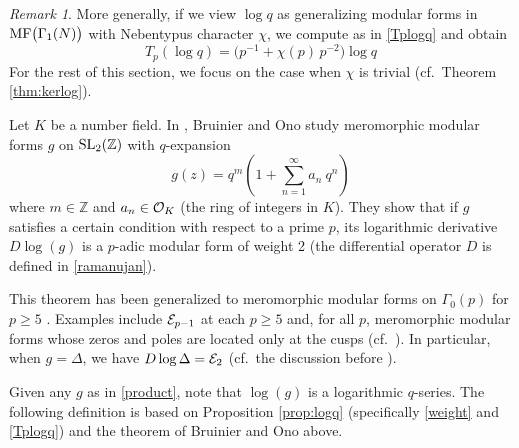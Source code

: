 \documentclass{gtpart}
\theoremstyle{definition}
\theoremstyle{remark}
\newtheorem{rmk}[equation]{Remark}
\newcommand{\mb}[1]{\mathbb{#1}}
\newcommand{\CE}{{\cal E}}
\newcommand{\CO}{{\cal O}}
\newcommand{\BZ}{{\mb Z}}
\newcommand{\MF}{{\rm MF}}
\renewcommand{\D}{\Delta}
\newcommand{\G}{\Gamma}
\renewcommand{\=}{\approx}
\renewcommand{\-}{\sim}
\newcommand{\SL}{{\rm SL}}
\numberwithin{equation}{section}
\begin{document}
\begin{rmk}
 \label{rmk:nebentypus}
 More generally, if we view $\log q$ as generalizing modular forms in 
 $\MF\big(\G_1(N)\big)$ with Nebentypus character $\chi$, we compute as in 
 \eqref{Tplogq} and obtain 
 \[
  T_p (\log q) = \big( p^{-1} + \chi(p) \, p^{-2} \big) \log q 
 \]
 For the rest of this section, we focus on the case when $\chi$ is trivial 
 (cf.~Theorem \ref{thm:kerlog}).  
\end{rmk}

Let $K$ be a number field.  In \cite{BruinierOno}, Bruinier and Ono study 
meromorphic modular forms $g$ on $\SL_2(\BZ)$ with $q$-expansion 
\begin{equation}
 \label{product}
 g(z) = q^m \left( 1 + \sum_{n = 1}^\infty a_n ~\! q^n \right) 
\end{equation}
where $m \in \BZ$ and $a_n \in \CO_K$ (the ring of integers in $K$).  They show 
that if $g$ satisfies a certain condition with respect to a prime $p$, its 
logarithmic derivative $D \log(g)$ is a $p$-adic modular form of weight 2 
\cite[Theorem 1]{BruinierOno} (the differential operator $D$ is defined in 
\eqref{ramanujan}).  

This theorem has been generalized to meromorphic modular forms on $\G_0(p)$ for 
$p \geq 5$ \cite[Theorem 4]{Getz}.  Examples include $\CE_{p - 1}$ at each 
$p \geq 5$ and, for all $p$, meromorphic modular forms whose zeros and poles are 
located only at the cusps (cf.~\cite[Definition 3.1]{BruinierOno}).  In 
particular, when $g = \D$, we have $D \log \D = \CE_2$ (cf.~the discussion 
before \cite[Th\'eor\`eme 5]{fmpadiq}).  

Given any $g$ as in \eqref{product}, note that $\log(g)$ is a logarithmic 
$q$-series.  The following definition is based on Proposition \ref{prop:logq} 
(specifically \eqref{weight} and \eqref{Tplogq}) and the theorem of Bruinier and 
Ono above.  
\end{document}
